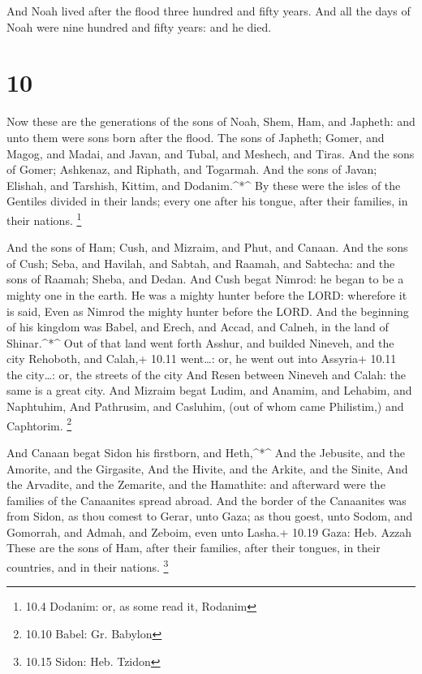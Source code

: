 And Noah lived after the flood three hundred and fifty
years.  And all the days of Noah were nine hundred and
fifty years: and he died.

\hypertarget{section-9}{%
\section{10}\label{section-9}}

 Now these are the generations of the sons of Noah, Shem,
Ham, and Japheth: and unto them were sons born after the flood.
 The sons of Japheth; Gomer, and Magog, and Madai, and
Javan, and Tubal, and Meshech, and Tiras.  And the sons of
Gomer; Ashkenaz, and Riphath, and Togarmah.  And the sons of
Javan; Elishah, and Tarshish, Kittim, and Dodanim.\^{}*\^{} 
By these were the isles of the Gentiles divided in their lands; every
one after his tongue, after their families, in their nations.
\footnote{10.4 Dodanim: or, as some read it, Rodanim}

 And the sons of Ham; Cush, and Mizraim, and Phut, and
Canaan.  And the sons of Cush; Seba, and Havilah, and
Sabtah, and Raamah, and Sabtecha: and the sons of Raamah; Sheba, and
Dedan.  And Cush begat Nimrod: he began to be a mighty one
in the earth.  He was a mighty hunter before the LORD:
wherefore it is said, Even as Nimrod the mighty hunter before the LORD.
 And the beginning of his kingdom was Babel, and Erech, and
Accad, and Calneh, in the land of Shinar.\^{}*\^{}  Out of
that land went forth Asshur, and builded Nineveh, and the city Rehoboth,
and Calah,+ 10.11 went\ldots: or, he went out into Assyria+ 10.11 the
city\ldots: or, the streets of the city  And Resen between
Nineveh and Calah: the same is a great city.  And Mizraim
begat Ludim, and Anamim, and Lehabim, and Naphtuhim,  And
Pathrusim, and Casluhim, (out of whom came Philistim,) and Caphtorim.
\footnote{10.10 Babel: Gr. Babylon}

 And Canaan begat Sidon his firstborn, and Heth,\^{}*\^{}
 And the Jebusite, and the Amorite, and the Girgasite,
 And the Hivite, and the Arkite, and the Sinite,
 And the Arvadite, and the Zemarite, and the Hamathite: and
afterward were the families of the Canaanites spread abroad.
 And the border of the Canaanites was from Sidon, as thou
comest to Gerar, unto Gaza; as thou goest, unto Sodom, and Gomorrah, and
Admah, and Zeboim, even unto Lasha.+ 10.19 Gaza: Heb. Azzah
 These are the sons of Ham, after their families, after
their tongues, in their countries, and in their nations. \footnote{10.15
  Sidon: Heb. Tzidon}

